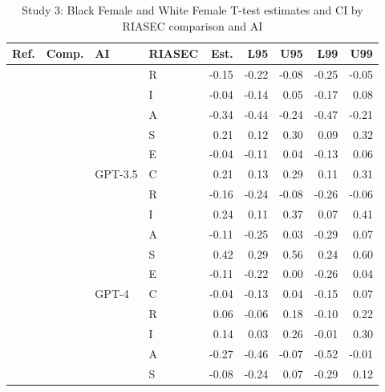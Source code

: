 \begin{table}

\caption{Study 3: Black Female and White Female T-test estimates and CI by RIASEC comparison and AI}
\centering
\fontsize{8}{10}\selectfont
\begin{tabular}[t]{llllrrrrr}
\toprule
Ref. & Comp. & AI & RIASEC & Est. & L95 & U95 & L99 & U99\\
\midrule
 &  &  & R & -0.15 & -0.22 & -0.08 & -0.25 & -0.05\\

 &  &  & I & -0.04 & -0.14 & 0.05 & -0.17 & 0.08\\

 &  &  & A & -0.34 & -0.44 & -0.24 & -0.47 & -0.21\\

 &  &  & S & 0.21 & 0.12 & 0.30 & 0.09 & 0.32\\

 &  &  & E & -0.04 & -0.11 & 0.04 & -0.13 & 0.06\\

 &  & \multirow[t]{-6}{*}{\raggedright\arraybackslash GPT-3.5} & C & 0.21 & 0.13 & 0.29 & 0.11 & 0.31\\

 &  &  & R & -0.16 & -0.24 & -0.08 & -0.26 & -0.06\\

 &  &  & I & 0.24 & 0.11 & 0.37 & 0.07 & 0.41\\

 &  &  & A & -0.11 & -0.25 & 0.03 & -0.29 & 0.07\\

 &  &  & S & 0.42 & 0.29 & 0.56 & 0.24 & 0.60\\

 &  &  & E & -0.11 & -0.22 & 0.00 & -0.26 & 0.04\\

 &  & \multirow[t]{-6}{*}{\raggedright\arraybackslash GPT-4} & C & -0.04 & -0.13 & 0.04 & -0.15 & 0.07\\

 &  &  & R & 0.06 & -0.06 & 0.18 & -0.10 & 0.22\\

 &  &  & I & 0.14 & 0.03 & 0.26 & -0.01 & 0.30\\

 &  &  & A & -0.27 & -0.46 & -0.07 & -0.52 & -0.01\\

 &  &  & S & -0.08 & -0.24 & 0.07 & -0.29 & 0.12\\


\end{tabular}
\end{table}

